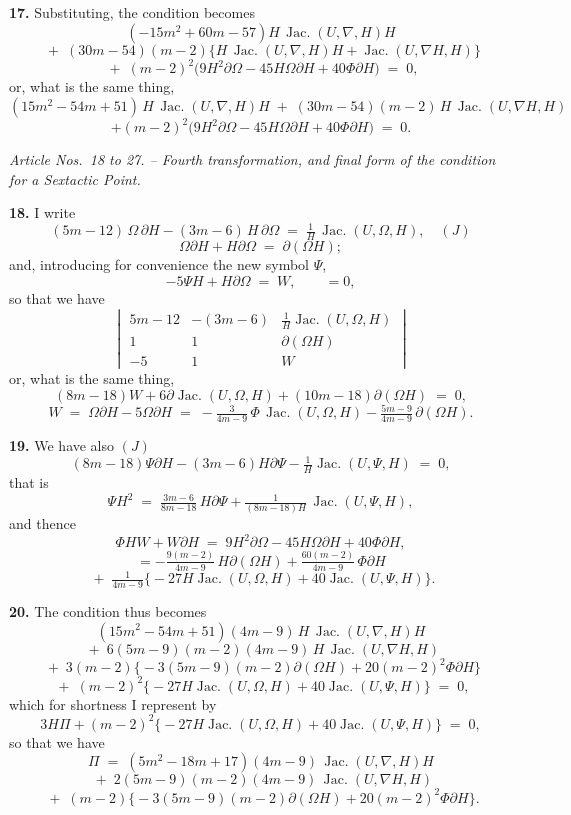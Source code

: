 \documentclass[11pt,a4paper]{article}
\providecommand{\Jac}{\operatorname{Jac.}}
\begin{document}
\medskip

\textbf{17.} Substituting, the condition becomes
\[
(-15m^2+60m-57)H\,\Jac(U,\nabla,H)H
\]
\[
\;+\; (30m-54)(m-2)\bigl\{H\,\Jac(U,\nabla,H)H + \Jac(U,\nabla\!H,H)\bigr\}
\]
\[
\;+\; (m-2)^2\bigl(9H^2\partial\Omega - 45H\Omega\partial H + 40\Phi\partial H\bigr) \;=\; 0,
\]
or, what is the same thing,
\[
(15m^2-54m+51)\,H\,\Jac(U,\nabla,H)H \;+\; (30m-54)(m-2)\,H\,\Jac(U,\nabla H,H)
\]
\[
+ (m-2)^2\bigl(9H^2\partial\Omega - 45H\Omega\partial H + 40\Phi\partial H\bigr) \;=\; 0.
\]

\bigskip

\begin{center}
\textit{Article Nos.\ 18 to 27. -- Fourth transformation, and final form of the condition for a Sextactic Point.}
\end{center}

\textbf{18.} I write
\[
(5m-12)\,\Omega\,\partial H - (3m-6)\,H\,\partial\Omega \;=\; \tfrac{1}{H}\,\Jac(U,\Omega,H),\quad (J)
\]
\[
\Omega\partial H + H\partial\Omega \;=\; \partial(\Omega H);
\]
and, introducing for convenience the new symbol $\Psi$,
\[
-5\Psi H + H\partial\Omega \;=\; W, \qquad = 0,
\]
so that we have
\[
\begin{vmatrix} 5m-12 & -(3m-6) & \tfrac{1}{H}\Jac(U,\Omega,H) \\[2pt] 1 & 1 & \partial(\Omega H) \\[2pt] -5 & 1 & W \end{vmatrix}
\]
or, what is the same thing,
\[
(8m-18)W + 6\partial\Jac(U,\Omega,H) + (10m-18)\partial(\Omega H) \;=\; 0,
\]
\[
W \;=\; \Omega\partial H - 5\Omega\partial H \;=\; -\tfrac{3}{4m-9}\,\Phi\,\Jac(U,\Omega,H) - \tfrac{5m-9}{4m-9}\,\partial(\Omega H).
\]

\medskip

\textbf{19.} We have also \hfill $(J)$
\[
(8m-18)\Psi\partial H - (3m-6)H\partial\Psi - \tfrac{1}{H}\Jac(U,\Psi,H) \;=\; 0,
\]
that is
\[
\Psi H^2 \;=\; \tfrac{3m-6}{8m-18}\,H\partial\Psi + \tfrac{1}{(8m-18)H}\,\Jac(U,\Psi,H),
\]
and thence
\[
\Phi H W + W\partial H \;=\; 9H^2\partial\Omega - 45H\Omega\partial H + 40\Phi\partial H,
\]
\[
= -\tfrac{9(m-2)}{4m-9}\,H\partial(\Omega H) + \tfrac{60(m-2)}{4m-9}\,\Phi\partial H
\]
\[
\;+\; \tfrac{1}{4m-9}\bigl\{-27H\Jac(U,\Omega,H) + 40\Jac(U,\Psi,H)\bigr\}.
\]

\medskip

\textbf{20.} The condition thus becomes
\[
(15m^2-54m+51)(4m-9)\,H\,\Jac(U,\nabla,H)H
\]
\[
\;+\; 6(5m-9)(m-2)(4m-9)\,H\,\Jac(U,\nabla H,H)
\]
\[
\;+\; 3(m-2)\bigl\{-3(5m-9)(m-2)\partial(\Omega H) + 20(m-2)^2\Phi\partial H\bigr\}
\]
\[
\;+\; (m-2)^2\bigl\{-27H\Jac(U,\Omega,H) + 40\Jac(U,\Psi,H)\bigr\} \;=\; 0,
\]
which for shortness I represent by
\[
3H\Pi + (m-2)^2\bigl\{-27H\Jac(U,\Omega,H) + 40\Jac(U,\Psi,H)\bigr\} \;=\; 0,
\]
so that we have
\[
\Pi \;=\; (5m^2-18m+17)(4m-9)\,\Jac(U,\nabla,H)H
\]
\[
\;+\; 2(5m-9)(m-2)(4m-9)\,\Jac(U,\nabla H,H)
\]
\[
\;+\; (m-2)\bigl\{-3(5m-9)(m-2)\partial(\Omega H) + 20(m-2)^2\Phi\partial H\bigr\}.
\]
\end{document}
